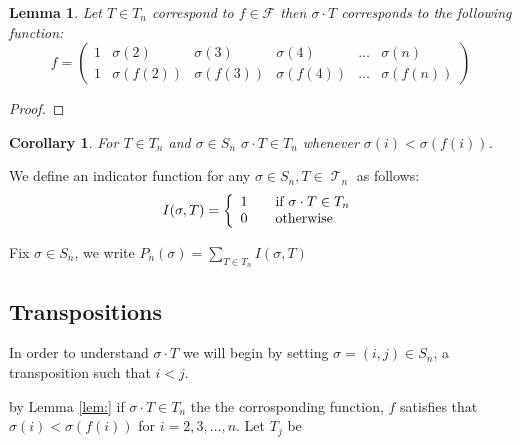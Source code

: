 \documentclass[12pt]{article} %
\newtheorem{corol}{Corollary}
\newtheorem{lem}[thm]{Lemma}
\theoremstyle{definition}
\DeclareMathOperator{\T}{\mathcal{T}}
\begin{document}
\begin{lem}
Let $T \in T_n$ correspond to $f \in \mathcal{F}$ then $\sigma \cdot T$ corresponds to the following  function:
\[ f= \left(\begin{array}{cccccc}
     1& \sigma(2)&\sigma(3) &\sigma(4)& \dots & \sigma(n) \\
     1 & \sigma(f(2)) &\sigma(f(3)) &\sigma(f(4)) &\dots & \sigma(f(n))
    \end{array} \right)
\]
\end{lem}

\begin{proof}
 
\end{proof}

\begin{corol}
For $T \in T_n$ and $ \sigma \in S_n$ $\sigma  \cdot T \in T_n$ whenever $\sigma(i)<\sigma(f(i))$. 
\end{corol}

 We define an indicator function for any $\sigma \in S_n, T \in \T_n$ as follows:
 \[ I(\sigma,T) = \left\{
  \begin{array}{l l}
    1 & \quad \text{if $\sigma \cdot T \in T_n$}\\
    0 & \quad \text{otherwise}
  \end{array} \right.\]

Fix $ \sigma \in S_n$, we write $P_n(\sigma) = \sum_{T \in T_n}I(\sigma,T)$ 
\subsection{Transpositions}
In order to understand $\sigma \cdot T$ we will begin by setting $\sigma = (i,j) \in S_n$, a transposition such that $i <j$.

by Lemma \ref{lem:} if $\sigma \cdot T \in T_n$ the the corrosponding function, $f$ satisfies that $\sigma(i) < \sigma(f(i))$ for $i = 2,3,\dots,n$.  Let  $T_j$ be %
\end{document}
